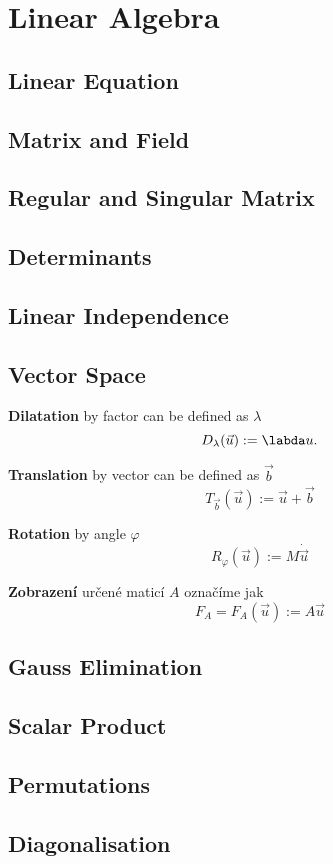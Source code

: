 
\chapter{Linear Algebra}
\section{Linear Equation}
\section{Matrix and Field}
\section{Regular and Singular Matrix}
\section{Determinants}
\section{Linear Independence}
\section{Vector Space}

\textbf{Dilatation} by factor can be defined as $\lambda$
$$
D_{\lambda}(\vec{u}) := \labda u.
$$

\textbf{Translation} by vector can be defined as $\vec{b}$ 
$$
T_{\vec{b}}(\vec{u}) := \vec{u} + \vec{b}
$$

\textbf{Rotation} by angle $\varphi$ 
$$
R_{\varphi}(\vec u) := M \dot \vec u
$$

\textbf{Zobrazení} určené maticí $A$ označíme jak 
$$
F_A = F_A(\vec u) := A\vec{u}
$$

\section{Gauss Elimination}
\section{Scalar Product}
\section{Permutations}
\section{Diagonalisation}
